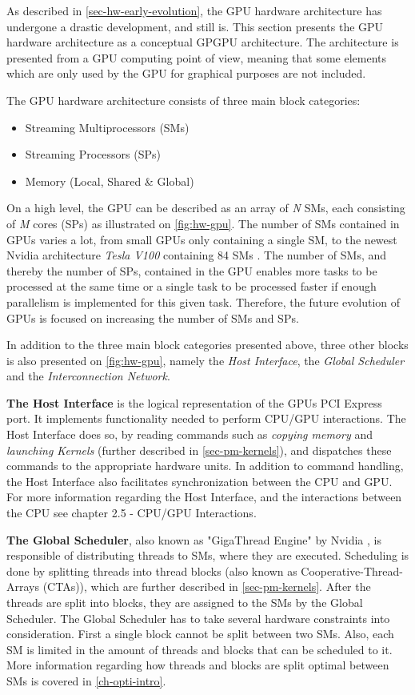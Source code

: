 As described in \cref{sec-hw-early-evolution}, the GPU hardware architecture has undergone a drastic development, and still is.
This section presents the GPU hardware architecture as a conceptual GPGPU architecture.
The architecture is presented from a GPU computing point of view, meaning that some elements which are only used by the GPU for graphical purposes are not included.

The GPU hardware architecture consists of three main block categories:
\begin{itemize}
	\item Streaming Multiprocessors (SMs)
	\item Streaming Processors (SPs) 
	\item Memory (Local, Shared \& Global)
\end{itemize}

On a high level, the GPU can be described as an array of \textit{N} SMs, each consisting of \textit{M} cores (SPs) as illustrated on \cref{fig:hw-gpu}. 
The number of SMs contained in GPUs varies a lot, from small GPUs only containing a single SM, to the newest Nvidia architecture \textit{Tesla V100} containing 84 SMs \cite{Nvidia2017}.
The number of SMs, and thereby the number of SPs, contained in the GPU enables more tasks to be processed at the same time or a single task to be processed faster if enough parallelism is implemented for this given task.
Therefore, the future evolution of GPUs is focused on increasing the number of SMs and SPs.

In addition to the three main block categories presented above, three other blocks is also presented on \cref{fig:hw-gpu}, namely the \textit{Host Interface}, the \textit{Global Scheduler} and the \textit{Interconnection Network}.

\textbf{The Host Interface} is the logical representation of the GPUs PCI Express port.
It implements functionality needed to perform CPU/GPU interactions. 
The Host Interface does so, by reading commands such as \textit{copying memory} and  \textit{launching Kernels} (further described in \cref{sec-pm-kernels}), and dispatches these commands to the appropriate hardware units.
In addition to command handling, the Host Interface also facilitates synchronization between the CPU and GPU. 
For more information regarding the Host Interface, and the interactions between the CPU see \cite{Wilt2013} chapter 2.5 - CPU/GPU Interactions.

\textbf{The Global Scheduler}, also known as "GigaThread Engine" by Nvidia \cite{Nvidia2009}, is responsible of distributing threads to SMs, where they are executed.
Scheduling is done by splitting threads into thread blocks (also known as Cooperative-Thread-Arrays (CTAs)), which are further described in \cref{sec-pm-kernels}.
After the threads are split into blocks, they are assigned to the SMs by the Global Scheduler.
The Global Scheduler has to take several hardware constraints into consideration.
First a single block cannot be split between two SMs.
Also, each SM is limited in the amount of threads and blocks that can be scheduled to it. 
More information regarding how threads and blocks are split optimal between SMs is covered in \cref{ch-opti-intro}.


